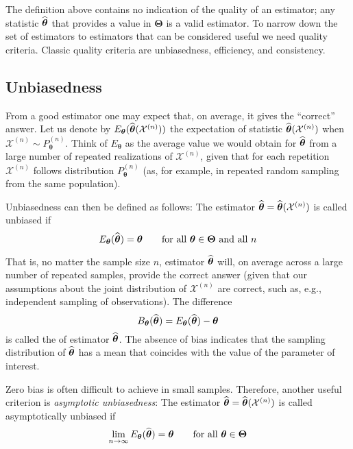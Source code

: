 The definition above contains no indication of the quality of an estimator; any
statistic $\widehat{\boldsymbol\theta}$ that provides a value in
$\boldsymbol\Theta$ is a valid estimator. To narrow down the set of estimators
to estimators that can be considered useful we need quality criteria. Classic
quality criteria are unbiasedness, efficiency, and consistency.

\subsection{Unbiasedness}
\Index[unbiasedness]{}

From a good estimator one may expect that, on average, it gives the “correct”
answer. Let us denote by
$E_{\boldsymbol\theta}(\widehat{\boldsymbol\theta}(\mathcal{X}^{(n)}))$ the
expectation of statistic $\widehat{\boldsymbol\theta}(\mathcal{X}^{(n)})$ when
$\mathcal{X}^{(n)} \sim P_{\boldsymbol\theta}^{(n)}$. Think of
$E_{\boldsymbol\theta}$ as the average value we would obtain for
$\widehat{\boldsymbol\theta}$ from a large number of repeated realizations of
$\mathcal{X}^{(n)}$, given that for each repetition $\mathcal{X}^{(n)}$ follows
distribution $P_{\boldsymbol\theta}^{(n)}$ (as, for example, in repeated random
sampling from the same population).

Unbiasedness can then be defined as follows:
The estimator $\widehat{\boldsymbol\theta} = \widehat{\boldsymbol\theta} 
(\mathcal{X}^{(n)})$ is called unbiased if
\[
    E_{\boldsymbol\theta}(\widehat{\boldsymbol\theta}) = \boldsymbol\theta
    \qquad
    \text{for all $\boldsymbol\theta \in \boldsymbol\Theta$ and all $n$}
\]

That is, no matter the sample size $n$, estimator $\widehat{\boldsymbol\theta}$
will, on average across a large number of repeated samples, provide the correct
answer (given that our assumptions about the joint distribution of
$\mathcal{X}^{(n)}$ are correct, such as, e.g., independent sampling of
observations). The difference
\[
    B_{\boldsymbol\theta}(\widehat{\boldsymbol\theta}) 
        = E_{\boldsymbol\theta}(\widehat{\boldsymbol\theta}) - \boldsymbol\theta
\]
is called the \emph{} of estimator $\widehat{\boldsymbol\theta}$.
The absence of bias indicates that the sampling distribution of
$\widehat{\boldsymbol\theta}$ has a mean that coincides with the value of the
parameter of interest.

Zero bias is often difficult to achieve in small samples. Therefore, another
useful criterion is \emph{asymptotic unbiasedness}: The estimator
$\widehat{\boldsymbol\theta} = \widehat{\boldsymbol\theta}(\mathcal{X}^{(n)})$ is
called asymptotically unbiased if
\[
    \lim_{n \rightarrow \infty} E_{\boldsymbol\theta}(\widehat{\boldsymbol\theta}) = \boldsymbol\theta
    \qquad
    \text{for all $\boldsymbol\theta \in \boldsymbol\Theta$}
\]

